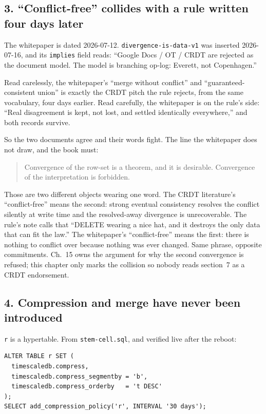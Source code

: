 \subsection{3. ``Conflict-free'' collides with a rule written four days later}

The whitepaper is dated 2026-07-12. \texttt{divergence-is-data-v1} was inserted 2026-07-16, and its \texttt{implies} field reads: ``Google Docs / OT / CRDT are rejected as the document model. The model is branching op-log: Everett, not Copenhagen.''

Read carelessly, the whitepaper's ``merge without conflict'' and ``guaranteed-consistent union'' is exactly the CRDT pitch the rule rejects, from the same vocabulary, four days earlier. Read carefully, the whitepaper is on the rule's side: ``Real disagreement is kept, not lost, and settled identically everywhere,'' and both records survive.

So the two documents agree and their words fight. The line the whitepaper does not draw, and the book must:

\begin{quote}
Convergence of the row-set is a theorem, and it is desirable. Convergence of the interpretation is forbidden.
\end{quote}

Those are two different objects wearing one word. The CRDT literature's ``conflict-free'' means the second: strong eventual consistency resolves the conflict silently at write time and the resolved-away divergence is unrecoverable. The rule's note calls that ``DELETE wearing a nice hat, and it destroys the only data that can fit the law.'' The whitepaper's ``conflict-free'' means the first: there is nothing to conflict over because nothing was ever changed. Same phrase, opposite commitments. Ch.~15 owns the argument for why the second convergence is refused; this chapter only marks the collision so nobody reads section~7 as a CRDT endorsement.

\subsection{4. Compression and merge have never been introduced}

\texttt{r} is a hypertable. From \texttt{stem-cell.sql}, and verified live after the reboot:

\begin{verbatim}
ALTER TABLE r SET (
  timescaledb.compress,
  timescaledb.compress_segmentby = 'b',
  timescaledb.compress_orderby   = 't DESC'
);
SELECT add_compression_policy('r', INTERVAL '30 days');
\end{verbatim}

